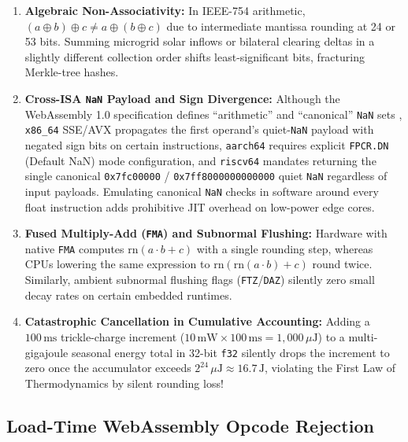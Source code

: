 \begin{enumerate}
\item \textbf{Algebraic Non-Associativity:} In IEEE-754 arithmetic, $(a \oplus b) \oplus c \neq a \oplus (b \oplus c)$
        due to intermediate mantissa rounding at 24 or 53 bits. Summing microgrid solar
        inflows or bilateral clearing deltas in a slightly different collection order shifts
        least-significant bits, fracturing Merkle-tree hashes.
\item \textbf{Cross-ISA \texttt{NaN} Payload and Sign Divergence:} Although the WebAssembly
        1.0 specification defines ``arithmetic'' and ``canonical'' \texttt{NaN} sets
        \parencite{haas2017wasm}, \texttt{x86\_64} SSE/AVX propagates the first operand's
        quiet-\texttt{NaN} payload with negated sign bits on certain instructions,
        \texttt{aarch64} requires explicit \texttt{FPCR.DN} (Default NaN) mode
        configuration, and \texttt{riscv64} mandates returning the single canonical
        \texttt{0x7fc00000} / \texttt{0x7ff8000000000000} quiet \texttt{NaN} regardless of
        input payloads. Emulating canonical \texttt{NaN} checks in software around every
        float instruction adds prohibitive JIT overhead on low-power edge cores.
\item \textbf{Fused Multiply-Add (\texttt{FMA}) and Subnormal Flushing:} Hardware with
        native \texttt{FMA} computes $\mathrm{rn}(a \cdot b + c)$ with a single rounding
        step, whereas CPUs lowering the same expression to $\mathrm{rn}(\mathrm{rn}(a \cdot b) + c)$
        round twice. Similarly, ambient subnormal flushing flags (\texttt{FTZ}/\texttt{DAZ})
        silently zero small decay rates on certain embedded runtimes.
\item \textbf{Catastrophic Cancellation in Cumulative Accounting:} Adding a
        $100\,\mathrm{ms}$ trickle-charge increment ($10\,\mathrm{mW} \times 100\,\mathrm{ms} = 1{,}000\,\mu\mathrm{J}$)
        to a multi-gigajoule seasonal energy total in 32-bit \texttt{f32} silently drops the
        increment to zero once the accumulator exceeds $2^{24}\,\mu\mathrm{J} \approx 16.7\,\mathrm{J}$,
        violating the First Law of Thermodynamics by silent rounding loss!
\end{enumerate}

\subsection{Load-Time WebAssembly Opcode Rejection}

